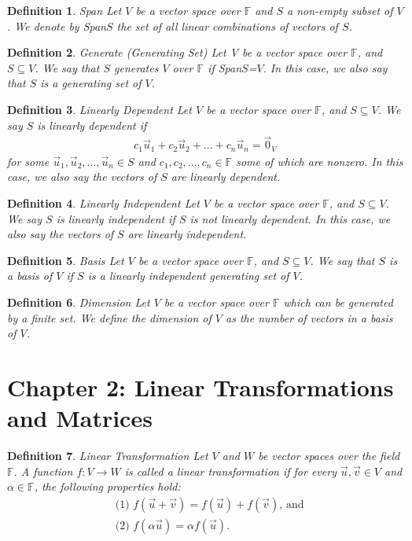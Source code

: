\documentclass[12pt,answers]{exam}
\newcommand{\F}{\mathbb{F}}
\newtheorem{definition}{Definition}[section]
\begin{document}
\begin{definition}{Span} 
Let $V$ be a vector space over $\mathbb{F}$ and $S$ a non-empty subset of $V$. We denote by Span$S$ the set of all linear combinations of vectors of $S$.
\end{definition}

\begin{definition}{Generate (Generating Set)} 
Let V be a vector space over $\mathbb{F}$, and $S\subseteq V$. We say that $S$ generates $V$ over $\mathbb{F}$ if Span$S$=$V$. In this case, we also say that $S$ is a generating set of $V$.
\end{definition}

\begin{definition}{Linearly Dependent}
Let $V$ be a vector space over $\mathbb{F}$, and $S\subseteq V$. We say $S$ is linearly dependent if
\begin{align*}
	c_{1}\vec{u}_{1}+c_{2}\vec{u}_{2}+...+c_{n}\vec{u}_{n}=\vec{0}_{V}
\end{align*}
for some $\vec{u}_{1},\vec{u}_{2},...,\vec{u}_{n}\in S$ and $c_{1},c_{2},...,c_{n}\in \mathbb{F}$ some of which are nonzero. In this case, we also say the vectors of $S$ are linearly dependent.
\end{definition}

\begin{definition}{Linearly Independent}
Let $V$ be a vector space over $\mathbb{F}$, and $S\subseteq V$. We say $S$ is linearly independent if $S$ is not linearly dependent. In this case, we also say the vectors of $S$ are linearly independent.
\end{definition}

\begin{definition}{Basis}
Let $V$ be a vector space over $\mathbb{F}$, and $S\subseteq V$. We say that $S$ is a basis of $V$ if $S$ is a linearly independent generating set of $V$. 
\end{definition}

\begin{definition}{Dimension}
Let $V$ be a vector space over $\mathbb{F}$ which can be generated by a finite set. We define the dimension of $V$ as the number of vectors in a basis of $V$. 
\end{definition}

\section{Chapter 2: Linear Transformations and Matrices}
\begin{definition}{Linear Transformation}
Let $V$ and $W$ be vector spaces over the field $\F$. A function $f:V\rightarrow W$ is called a linear transformation if for every $\vec{u},\vec{v}\in V$ and $\alpha \in \F$, the following properties hold:
\begin{align*}
	&\text{(1) } f(\vec{u}+\vec{v})=f(\vec{u})+f(\vec{v}) \text{, and} \\
	&\text{(2) } f(\alpha \vec{u})=\alpha f(\vec{u}).
\end{align*}
\end{definition}
\end{document}
